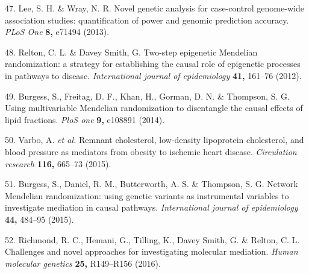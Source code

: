\documentclass[]{article}
\begin{document}
\hypertarget{ref-Lee2013c}{}
47. Lee, S. H. \& Wray, N. R. Novel genetic analysis for case-control
genome-wide association studies: quantification of power and genomic
prediction accuracy. \emph{PLoS One} \textbf{8,} e71494 (2013).

\hypertarget{ref-Relton2012}{}
48. Relton, C. L. \& Davey Smith, G. Two-step epigenetic Mendelian
randomization: a strategy for establishing the causal role of epigenetic
processes in pathways to disease. \emph{International journal of
epidemiology} \textbf{41,} 161--76 (2012).

\hypertarget{ref-Burgess2014a}{}
49. Burgess, S., Freitag, D. F., Khan, H., Gorman, D. N. \& Thompson, S.
G. Using multivariable Mendelian randomization to disentangle the causal
effects of lipid fractions. \emph{PloS one} \textbf{9,} e108891 (2014).

\hypertarget{ref-Varbo2015}{}
50. Varbo, A. \emph{et al.} Remnant cholesterol, low-density lipoprotein
cholesterol, and blood pressure as mediators from obesity to ischemic
heart disease. \emph{Circulation research} \textbf{116,} 665--73 (2015).

\hypertarget{ref-Burgess2015}{}
51. Burgess, S., Daniel, R. M., Butterworth, A. S. \& Thompson, S. G.
Network Mendelian randomization: using genetic variants as instrumental
variables to investigate mediation in causal pathways.
\emph{International journal of epidemiology} \textbf{44,} 484--95
(2015).

\hypertarget{ref-Richmond2016}{}
52. Richmond, R. C., Hemani, G., Tilling, K., Davey Smith, G. \& Relton,
C. L. Challenges and novel approaches for investigating molecular
mediation. \emph{Human molecular genetics} \textbf{25,} R149--R156
(2016).
\end{document}
